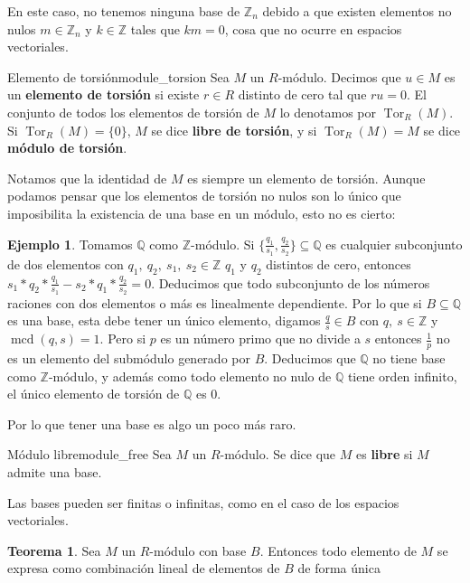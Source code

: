 \documentclass[a4paper]{book}
\theoremstyle{definition}
\newtheorem{theorem}{Teorema}[section]
\theoremstyle{ejemplo}
\newtheorem{ejem}{Ejemplo}[section]
\theoremstyle{demostracion}
\newcommand{\racionales}{\mathbb{Q}}
\newcommand{\enteros}{\mathbb{Z}}
\DeclareMathOperator{\mcd}{mcd}
\DeclareMathOperator{\tor}{Tor}
\begin{document}
En este caso, no tenemos ninguna base de $\enteros_n$ debido a que existen elementos no nulos $m \in \enteros_n$ y $k \in \enteros$ tales que $km = 0$, cosa que no ocurre en espacios vectoriales.

\begin{define}{Elemento de torsión}{module_torsion}
	Sea $M$ un $R$-módulo. Decimos que $u \in M$ es un \textbf{elemento de torsión} si existe $r \in R$ distinto de cero tal que $ru = 0$. El conjunto de todos los elementos de torsión de $M$ lo denotamos por $\tor_R(M)$. Si $\tor_R(M) = \{ 0 \}$, $M$ se dice \textbf{libre de torsión}, y si $\tor_R(M) = M$ se dice \textbf{módulo de torsión}.
\end{define}

Notamos que la identidad de $M$ es siempre un elemento de torsión.
Aunque podamos pensar que los elementos de torsión no nulos son lo único que imposibilita la existencia de una base en un módulo, esto no es cierto:

\begin{ejem}
	Tomamos $\racionales$ como $\enteros$-módulo. Si $\{\frac{q_1}{s_1}, \frac{q_2}{s_2} \} \subseteq \racionales$ es cualquier subconjunto de dos elementos con $q_1,\ q_2,\ s_1,\ s_2 \in \enteros$ $q_1$ y $q_2$ distintos de cero, entonces $s_1 * q_2 * \frac{q_1}{s_1} - s_2 * q_1 * \frac{q_2}{s_2} = 0$. Deducimos que todo subconjunto de los números raciones con dos elementos o más es linealmente dependiente. Por lo que si $B \subseteq \racionales$ es una base, esta debe tener un único elemento, digamos $\frac{q}{s} \in B$ con $q,\ s \in \enteros$ y $\mcd(q, s) = 1$. Pero si $p$ es un número primo que no divide a $s$ entonces $\frac{1}{p}$ no es un elemento del submódulo generado por $B$. Deducimos que $\racionales$ no tiene base como $\enteros$-módulo, y además como todo elemento no nulo de $\racionales$ tiene orden infinito, el único elemento de torsión de $\racionales$ es $0$.
\end{ejem}

Por lo que tener una base es algo un poco más raro.
\begin{define}{Módulo libre}{module_free}
	Sea $M$ un $R$-módulo. Se dice que $M$ es \textbf{libre} si $M$ admite una base.
\end{define}
Las bases pueden ser finitas o infinitas, como en el caso de los espacios vectoriales.
\begin{theorem}
	Sea $M$ un $R$-módulo con base $B$. Entonces todo elemento de $M$ se expresa como combinación lineal de elementos de $B$ de forma única
\end{theorem}
\end{document}

